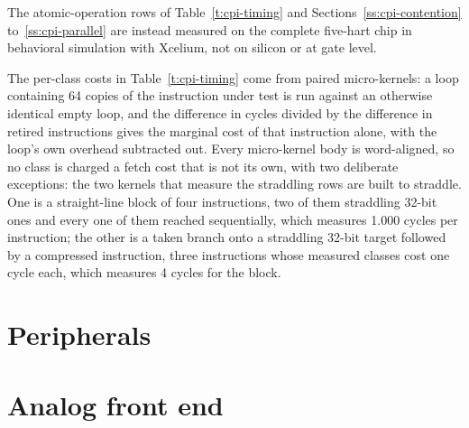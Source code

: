\documentclass[11pt,pdftex,openany,letterpaper]{report}
\begin{document}
\ifnum{} The atomic-operation rows of Table~\ref{t:cpi-timing} and Sections~\ref{ss:cpi-contention} to~\ref{ss:cpi-parallel} are instead measured on the complete five-hart chip in behavioral simulation with Xcelium, not on silicon or at gate level.\fi

The per-class costs in Table~\ref{t:cpi-timing} come from paired micro-kernels: a loop containing 64 copies of the instruction under test is run against an otherwise identical empty loop, and the difference in cycles divided by the difference in retired instructions gives the marginal cost of that instruction alone, with the loop's own overhead subtracted out. Every micro-kernel body is word-aligned, so no class is charged a fetch cost that is not its own, with two deliberate exceptions: the two kernels that measure the straddling rows are built to straddle. One is a straight-line block of four instructions, two of them straddling 32-bit ones and every one of them reached sequentially, which measures 1.000 cycles per instruction; the other is a taken branch onto a straddling 32-bit target followed by a compressed instruction, three instructions whose measured classes cost one cycle each, which measures 4 cycles for the block.

\clearpage






\part{Peripherals}





\part{Analog front end}
\end{document}
